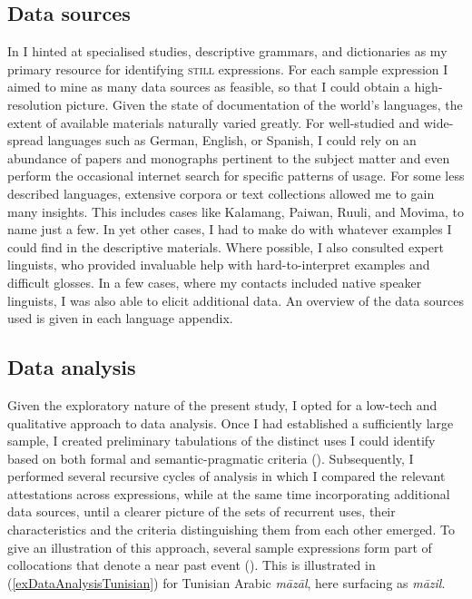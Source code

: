 \subsection{Data sources}
\label{sectionDataSources}
In  I hinted at specialised studies, descriptive grammars, and dictionaries as my primary resource for identifying \textsc{still} expressions. For each sample expression I aimed to mine as many data sources as feasible, so that I could obtain a high-resolution picture. Given the state of documentation of the world's languages, the extent of available materials naturally varied greatly. For well-studied and wide-spread languages such as German, English,  or Spanish, I could rely on an abundance of papers and monographs pertinent to the subject matter and even perform the occasional internet search for specific patterns of usage. For some less described languages, extensive corpora or text collections allowed me to gain many insights. This includes cases like Kalamang, Paiwan, Ruuli, and Movima, to name just a few. In yet other cases, I had to make do with whatever examples I could find in the descriptive materials. Where possible, I also consulted expert linguists, who provided invaluable help with hard-to-interpret examples and difficult glosses. In a few cases, where my contacts included native speaker linguists, I was also able to elicit additional data. An overview of the data sources used is given in each language appendix.

\subsection{Data analysis}\label{sectionDataAnalysis}
Given the exploratory nature of the present study, I opted for a low-tech and qualitative approach to data analysis. Once I had established a sufficiently large sample, I created preliminary tabulations of the distinct uses I could identify based on both formal and semantic-pragmatic criteria (). Subsequently, I performed several recursive cycles of analysis in which I compared the relevant attestations across expressions, while at the same time incorporating additional data sources, until a clearer picture of the sets of recurrent uses, their characteristics and the criteria distinguishing them from each other emerged. To give an illustration of this approach, several sample expressions form part of collocations that denote a near past event (). This is illustrated in (\ref{exDataAnalysisTunisian}) for Tunisian Arabic \textit{māzāl}, here surfacing as \textit{māzil}.

